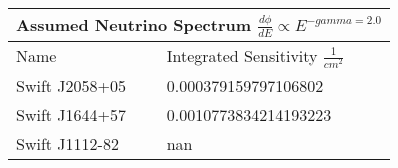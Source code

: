 \documentclass[]{article}
\begin{document}
\begin{tabular}{ |p{3.5cm}||p{4.5cm}|} 
\hline 
\multicolumn{2}{|c|}{Assumed Neutrino Spectrum $ \frac {d \phi}{dE} \propto E ^ {-gamma=2.0} $} \\ 
\hline 
Name&Integrated Sensitivity $\frac{1}{cm^{2}} $ \\ 
\hline 
Swift J2058+05 & \num[round-precision=2, round-mode=figures, scientific-notation=true]{0.000379159797106802}  \\ 
Swift J1644+57 & \num[round-precision=2, round-mode=figures, scientific-notation=true]{0.0010773834214193223}  \\ 
Swift J1112-82 & \num[round-precision=2, round-mode=figures, scientific-notation=true]{nan}  \\ 
\hline 
\end{tabular} 
\end{document}
